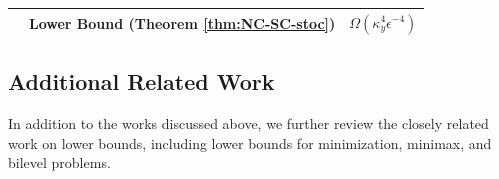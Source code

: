 \documentclass{article}
\begin{document}
\begin{table}[htbp]
\begin{tabular}{c c c}
    \addlinespace
    &  \cellcolor{gray!20} Lower Bound (Theorem \ref{thm:NC-SC-stoc}) & 
     \cellcolor{gray!20}
    $\Omega(\kappa_y^{4} \epsilon^{-4})$ \\ 
    \hline
    \end{tabular}
\end{table}

\subsection{Additional Related Work}
In addition to the works discussed above, we further review the closely related work on lower bounds, including lower bounds for minimization, minimax, and bilevel problems.
\end{document}
